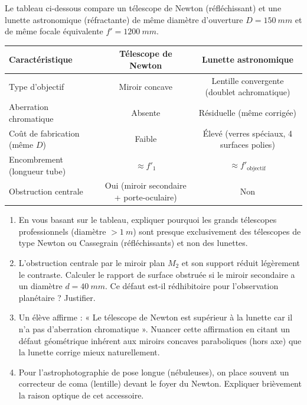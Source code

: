 \documentclass[11pt]{article}
\begin{document}
\begin{exercice}
Le tableau ci-dessous compare un télescope de Newton (réfléchissant) et une lunette astronomique (réfractante) de même diamètre d'ouverture $D = \SI{150}{mm}$ et de même focale équivalente $f' = \SI{1200}{mm}$.

\begin{tabular}{|l|c|c|}
\hline
\textbf{Caractéristique} & \textbf{Télescope de Newton} & \textbf{Lunette astronomique} \\
\hline
Type d'objectif & Miroir concave & Lentille convergente (doublet achromatique) \\
Aberration chromatique & Absente & Résiduelle (même corrigée) \\
Coût de fabrication (même $D$) & Faible & Élevé (verres spéciaux, 4 surfaces polies) \\
Encombrement (longueur tube) & $\approx f'_1$ & $\approx f'_{\text{objectif}}$ \\
Obstruction centrale & Oui (miroir secondaire + porte-oculaire) & Non \\
\hline
\end{tabular}

\begin{enumerate}
    \item En vous basant sur le tableau, expliquer pourquoi les grands télescopes professionnels (diamètre $> \SI{1}{m}$) sont presque exclusivement des télescopes de type Newton ou Cassegrain (réfléchissants) et non des lunettes.
    \item L'obstruction centrale par le miroir plan $M_2$ et son support réduit légèrement le contraste. Calculer le rapport de surface obstruée si le miroir secondaire a un diamètre $d = \SI{40}{mm}$. Ce défaut est-il rédhibitoire pour l'observation planétaire ? Justifier.
    \item Un élève affirme : « Le télescope de Newton est supérieur à la lunette car il n'a pas d'aberration chromatique ». Nuancer cette affirmation en citant un défaut géométrique inhérent aux miroirs concaves paraboliques (hors axe) que la lunette corrige mieux naturellement.
    \item Pour l'astrophotographie de pose longue (nébuleuses), on place souvent un correcteur de coma (lentille) devant le foyer du Newton. Expliquer brièvement la raison optique de cet accessoire.
\end{enumerate}
\end{exercice}
\end{document}
